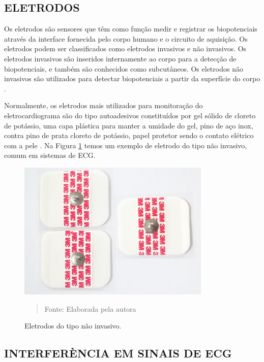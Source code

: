 \documentclass[12pt, a4paper]{article}
\begin{document}
\subsection{ELETRODOS}

\hspace*{0.8cm}Os eletrodos são sensores que têm como função medir e registrar os biopotenciais através da interface fornecida pelo corpo humano e o circuito de aquisição. Os eletrodos podem ser classificados como eletrodos invasivos e não invasivos. Os eletrodos invasivos são inseridos internamente ao corpo para a detecção de biopotenciais, e também são conhecidos como subcutâneos. Os eletrodos não invasivos são utilizados para detectar biopotenciais a partir da superfície do corpo \cite{vier}.

Normalmente, os eletrodos mais utilizados para monitoração do eletrocardiograma são do tipo autoadesivos constituídos por gel sólido de cloreto de potássio, uma capa plástica para manter a umidade do gel, pino de aço inox, contra pino de prata cloreto de potássio, papel protetor sendo o contato elétrico com a pele \cite{Site22}. Na Figura \ref{fig:eletrodo} temos um exemplo de eletrodo do tipo não invasivo, comum em sistemas de ECG.

\begin{figure}[!htpb]
\begin{center}
			\caption{Eletrodos do tipo não invasivo.}
			\includegraphics[width=.5\textwidth]{Figuras/eletrodo.png}
            \vspace*{\fill} 
            \begin{quote} 
            \centering 
            Fonte: Elaborada pela autora
            \end{quote}
            \vspace*{\fill}
			\label{fig:eletrodo}
\end{center}
\end{figure}

\subsection{INTERFERÈNCIA EM SINAIS DE ECG}
\end{document}
